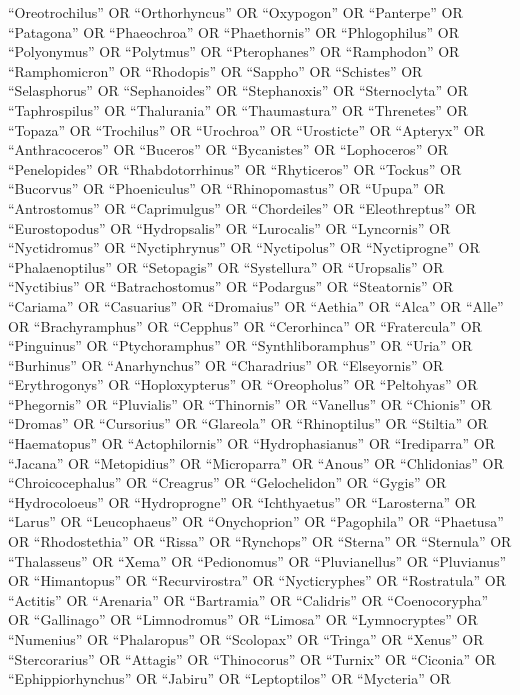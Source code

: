 \documentclass[
  number,
  review,
  onecolumn]{elsarticle}
\begin{document}
``Oreotrochilus'' OR ``Orthorhyncus'' OR ``Oxypogon'' OR ``Panterpe'' OR
``Patagona'' OR ``Phaeochroa'' OR ``Phaethornis'' OR ``Phlogophilus'' OR
``Polyonymus'' OR ``Polytmus'' OR ``Pterophanes'' OR ``Ramphodon'' OR
``Ramphomicron'' OR ``Rhodopis'' OR ``Sappho'' OR ``Schistes'' OR
``Selasphorus'' OR ``Sephanoides'' OR ``Stephanoxis'' OR ``Sternoclyta''
OR ``Taphrospilus'' OR ``Thalurania'' OR ``Thaumastura'' OR
``Threnetes'' OR ``Topaza'' OR ``Trochilus'' OR ``Urochroa'' OR
``Urosticte'' OR ``Apteryx'' OR ``Anthracoceros'' OR ``Buceros'' OR
``Bycanistes'' OR ``Lophoceros'' OR ``Penelopides'' OR
``Rhabdotorrhinus'' OR ``Rhyticeros'' OR ``Tockus'' OR ``Bucorvus'' OR
``Phoeniculus'' OR ``Rhinopomastus'' OR ``Upupa'' OR ``Antrostomus'' OR
``Caprimulgus'' OR ``Chordeiles'' OR ``Eleothreptus'' OR
``Eurostopodus'' OR ``Hydropsalis'' OR ``Lurocalis'' OR ``Lyncornis'' OR
``Nyctidromus'' OR ``Nyctiphrynus'' OR ``Nyctipolus'' OR ``Nyctiprogne''
OR ``Phalaenoptilus'' OR ``Setopagis'' OR ``Systellura'' OR
``Uropsalis'' OR ``Nyctibius'' OR ``Batrachostomus'' OR ``Podargus'' OR
``Steatornis'' OR ``Cariama'' OR ``Casuarius'' OR ``Dromaius'' OR
``Aethia'' OR ``Alca'' OR ``Alle'' OR ``Brachyramphus'' OR ``Cepphus''
OR ``Cerorhinca'' OR ``Fratercula'' OR ``Pinguinus'' OR
``Ptychoramphus'' OR ``Synthliboramphus'' OR ``Uria'' OR ``Burhinus'' OR
``Anarhynchus'' OR ``Charadrius'' OR ``Elseyornis'' OR ``Erythrogonys''
OR ``Hoploxypterus'' OR ``Oreopholus'' OR ``Peltohyas'' OR ``Phegornis''
OR ``Pluvialis'' OR ``Thinornis'' OR ``Vanellus'' OR ``Chionis'' OR
``Dromas'' OR ``Cursorius'' OR ``Glareola'' OR ``Rhinoptilus'' OR
``Stiltia'' OR ``Haematopus'' OR ``Actophilornis'' OR ``Hydrophasianus''
OR ``Irediparra'' OR ``Jacana'' OR ``Metopidius'' OR ``Microparra'' OR
``Anous'' OR ``Chlidonias'' OR ``Chroicocephalus'' OR ``Creagrus'' OR
``Gelochelidon'' OR ``Gygis'' OR ``Hydrocoloeus'' OR ``Hydroprogne'' OR
``Ichthyaetus'' OR ``Larosterna'' OR ``Larus'' OR ``Leucophaeus'' OR
``Onychoprion'' OR ``Pagophila'' OR ``Phaetusa'' OR ``Rhodostethia'' OR
``Rissa'' OR ``Rynchops'' OR ``Sterna'' OR ``Sternula'' OR
``Thalasseus'' OR ``Xema'' OR ``Pedionomus'' OR ``Pluvianellus'' OR
``Pluvianus'' OR ``Himantopus'' OR ``Recurvirostra'' OR ``Nycticryphes''
OR ``Rostratula'' OR ``Actitis'' OR ``Arenaria'' OR ``Bartramia'' OR
``Calidris'' OR ``Coenocorypha'' OR ``Gallinago'' OR ``Limnodromus'' OR
``Limosa'' OR ``Lymnocryptes'' OR ``Numenius'' OR ``Phalaropus'' OR
``Scolopax'' OR ``Tringa'' OR ``Xenus'' OR ``Stercorarius'' OR
``Attagis'' OR ``Thinocorus'' OR ``Turnix'' OR ``Ciconia'' OR
``Ephippiorhynchus'' OR ``Jabiru'' OR ``Leptoptilos'' OR ``Mycteria'' OR
\end{document}
